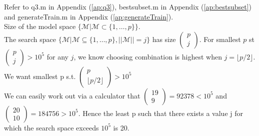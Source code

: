 \documentclass{article}
\begin{document}
	\section{}
	Refer to q3.m in Appendix (\ref{ap:q3}), bestsubset.m in Appendix (\ref{ap:bestsubset}) and generateTrain.m in Appendix (\ref{ap:generateTrain}).\\
	Size of the model space $ \{\mathcal{M} | \mathcal{M} \subset \{1, \dots, p\}\} $.\\
	The search space $ \{\mathcal{M}| \mathcal{M} \subseteq \{1, \dots, p\}, ||\mathcal{M}|| = j\} $ has size $ \begin{pmatrix} p \\ j \end{pmatrix} $. For smallest $p$ st $ \begin{pmatrix} p \\ j \end{pmatrix} > 10^5$ for any $j$, we know choosing combination is highest when $j = \lfloor p/2 \rfloor$. 
	We want smallest p s.t. $ \begin{pmatrix} p \\ \lfloor p/2 \rfloor \end{pmatrix} > 10^5 $\\
	We can easily work out via a calculator that $ \begin{pmatrix} 19 \\ 9 \end{pmatrix} = 92378 < 10^5 $ and $ \begin{pmatrix} 20 \\ 10 \end{pmatrix} = 184756 > 10^5 $. Hence the least p such that there exists a value j for which the search space exceeds $ 10^5 $ is 20.
	
	
\end{document}
